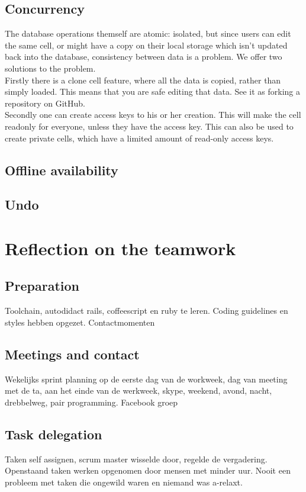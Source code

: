 \documentclass[10pt,a4paper]{report}
\begin{document}
		\subsection{Concurrency}
			The database operations themself are atomic: isolated, but since users can edit the same cell, or might have a copy on their local storage which isn't updated back into the database, consistency between data is a problem. We offer two solutions to the problem.\\ 
			
			Firstly there is a clone cell feature, where all the data is copied, rather than simply loaded. This means that you are safe editing that data. See it as forking a repository on GitHub.\\
			
			Secondly one can create access keys to his or her creation. This will make the cell readonly for everyone, unless they have the access key. This can also be used to create private cells, which have a limited amount of read-only access keys.
		
		\subsection{Offline availability}
			
		
		\subsection{Undo}
	
	\section{Reflection on the teamwork}
		
		\subsection{Preparation}
Toolchain, autodidact rails, coffeescript en ruby te leren. Coding guidelines en styles hebben opgezet. 
Contactmomenten
		
		\subsection{Meetings and contact}
Wekelijks sprint planning op de eerste dag van de workweek, dag van meeting met de ta, aan het einde van de werkweek, skype, weekend, avond, nacht, drebbelweg, pair programming. Facebook groep

		\subsection{Task delegation}
Taken self assignen, scrum master wisselde door, regelde de vergadering. Openstaand taken werken opgenomen door mensen met minder uur. Nooit een probleem met taken die ongewild waren en niemand was a-relaxt. 
\end{document}
